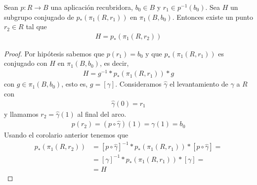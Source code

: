 \begin{coro}
    Sean $p:R\to B$ una aplicación recubridora, $b_0\in B$ y $r_1\in p^{-1}(b_0)$. Sea $H$ un subgrupo conjugado de $p_*(\pi_1(R,r_1))$ en $\pi_1(B,b_0)$. Entonces existe un punto $r_2\in R$ tal que
    \begin{gather*}
        H=p_*(\pi_1(R,r_2))
    \end{gather*}
    \begin{proof}
        Por hipótesis sabemos que $p(r_1)=b_0$ y que $p_*(\pi_1(R,r_1))$ es conjugado con $H$ en $\pi_1(B,b_0)$, es decir, 
        \begin{gather*}
            H = g^{-1} \ast p_*(\pi_1(R,r_1)) \ast g
        \end{gather*}
        con $g\in \pi_1(B,b_0)$, esto es, $g=[\gamma]$. Consideramos $\hat{\gamma}$ el levantamiento de $\gamma$ a $R$ con 
        \begin{gather*}
            \hat{\gamma}(0) = r_1
        \end{gather*}
        y llamamos $r_2=\hat{\gamma}(1)$ al final del arco.
        \begin{gather*}
            p(r_2) = (p\circ \hat{\gamma})(1) = \gamma(1) = b_0
        \end{gather*}
        Usando el corolario anterior tenemos que 
        \begin{align*}
            p_*(\pi_1(R,r_2)) &= [p\circ \hat{\gamma}]^{-1} \ast p_*(\pi_1(R,r_1)) \ast [p\circ \hat{\gamma}] =\\
            &= [\gamma]^{-1} \ast p_*(\pi_1(R,r_1)) \ast [\gamma] =\\
            &= H
        \end{align*}
    \end{proof}
\end{coro}

